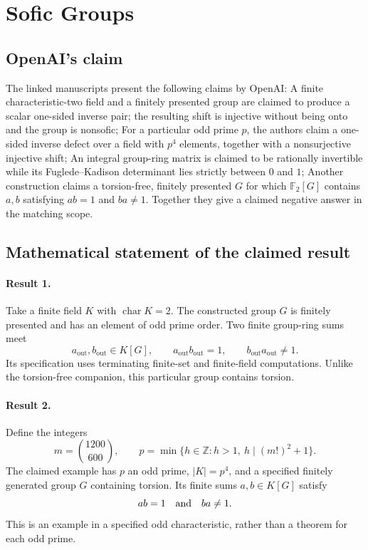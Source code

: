 \documentclass[11pt]{article}
\begin{document}
\section*{Sofic Groups}

\subsection{OpenAI's claim}
The linked manuscripts present the following claims by OpenAI: A finite characteristic-two field and a finitely presented group are claimed to produce a scalar one-sided inverse pair; the resulting shift is injective without being onto and the group is nonsofic; For a particular odd prime $p$, the authors claim a one-sided inverse defect over a field with $p^4$ elements, together with a nonsurjective injective shift; An integral group-ring matrix is claimed to be rationally invertible while its Fuglede--Kadison determinant lies strictly between $0$ and $1$; Another construction claims a torsion-free, finitely presented $G$ for which $\mathbb F_2[G]$ contains $a,b$ satisfying $ab=1$ and $ba\ne1$. Together they give a claimed negative answer in the matching scope.

\subsection{Mathematical statement of the claimed result}
\paragraph{Result 1.} Take a finite field \(K\) with \(\operatorname{char}K=2\). The constructed group \(G\) is finitely presented and has an element of odd prime order. Two finite group-ring sums meet
\[
 a_{\mathrm{out}},b_{\mathrm{out}}\in K[G],\qquad
 a_{\mathrm{out}}b_{\mathrm{out}}=1,\qquad
 b_{\mathrm{out}}a_{\mathrm{out}}\ne1.
\]
Its specification uses terminating finite-set and finite-field computations. Unlike the torsion-free companion, this particular group contains torsion.

\paragraph{Result 2.} Define the integers
\[
 m=\binom{1200}{600},\qquad
 p=\min\{h\in\mathbb Z:h>1,\ h\mid(m!)^2+1\}.
\]
The claimed example has \(p\) an odd prime, \(|K|=p^4\), and a specified finitely generated group \(G\) containing torsion. Its finite sums \(a,b\in K[G]\) satisfy
\[
 ab=1\quad\hbox{and}\quad ba\ne1.
\]
This is an example in a specified odd characteristic, rather than a theorem for each odd prime.
\end{document}

